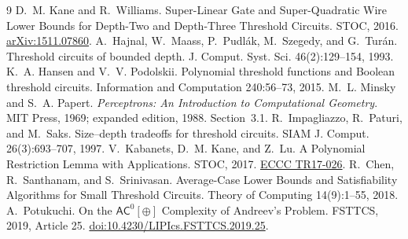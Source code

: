 \documentclass[11pt]{article}
\begin{document}
\begin{thebibliography}{9}\small
{} D.~M. Kane and R.~Williams.
Super-Linear Gate and Super-Quadratic Wire Lower Bounds for Depth-Two and
Depth-Three Threshold Circuits. STOC, 2016.
\href{https://arxiv.org/abs/1511.07860}{arXiv:1511.07860}.
 A.~Hajnal, W.~Maass, P.~Pudl\'ak, M.~Szegedy, and G.~Tur\'an.
Threshold circuits of bounded depth. J. Comput. Syst. Sci. 46(2):129--154, 1993.
 K.~A. Hansen and V.~V. Podolskii.
Polynomial threshold functions and Boolean threshold circuits.
Information and Computation 240:56--73, 2015.
 M.~L. Minsky and S.~A. Papert.
\emph{Perceptrons: An Introduction to Computational Geometry}.
MIT Press, 1969; expanded edition, 1988. Section~3.1.
 R.~Impagliazzo, R.~Paturi, and M.~Saks.
Size--depth tradeoffs for threshold circuits. SIAM J. Comput. 26(3):693--707, 1997.
 V.~Kabanets, D.~M. Kane, and Z.~Lu.
A Polynomial Restriction Lemma with Applications. STOC, 2017.
\href{https://eccc.weizmann.ac.il/report/2017/026/}{ECCC TR17-026}.
 R.~Chen, R.~Santhanam, and S.~Srinivasan.
Average-Case Lower Bounds and Satisfiability Algorithms for Small Threshold
Circuits. Theory of Computing 14(9):1--55, 2018.
 A.~Potukuchi.
On the $\mathsf{AC}^0[\oplus]$ Complexity of Andreev's Problem.
FSTTCS, 2019, Article 25.
\href{https://doi.org/10.4230/LIPIcs.FSTTCS.2019.25}{doi:10.4230/LIPIcs.FSTTCS.2019.25}.
\end{thebibliography}
\end{document}
